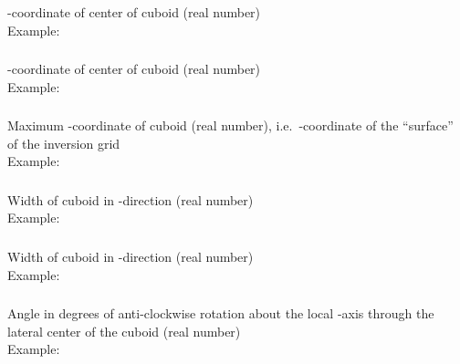 \subsubsection{}
-coordinate of center of cuboid (real number)\\
Example:\\
\subsubsection{}
-coordinate of center of cuboid (real number)\\
Example:\\
\subsubsection{}
Maximum -coordinate of cuboid (real number), i.e.\ -coordinate of the 
``surface'' of the inversion grid\\
Example:\\
\subsubsection{}
Width of cuboid in -direction (real number)\\
Example:\\
\subsubsection{}
Width of cuboid in -direction (real number)\\
Example:\\
\subsubsection{}
Angle in degrees of anti-clockwise rotation about the local -axis through the 
lateral center of the cuboid (real number)\\
Example:\\
